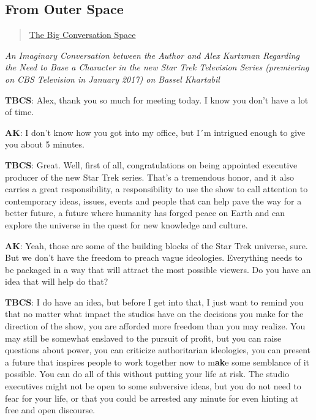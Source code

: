 \subsection{From Outer Space}\label{from-outer-space}

\begin{quote}
\href{../appendix/attributions.html\#the-big-conversation-space}{The Big
Conversation Space}
\end{quote}

\emph{An Imaginary Conversation between the Author and Alex Kurtzman
Regarding the Need to Base a Character in the new Star Trek Television
Series (premiering on CBS Television in January 2017) on Bassel
Khartabil}

\textbf{TBCS}: Alex, thank you so much for meeting today. I know you
don't have a lot of time.

\textbf{AK}: I don't know how you got into my office, but I´m intrigued
enough to give you about 5 minutes.

\textbf{TBCS}: Great. Well, first of all, congratulations on being
appointed executive producer of the new Star Trek series. That's a
tremendous honor, and it also carries a great responsibility, a
responsibility to use the show to call attention to contemporary ideas,
issues, events and people that can help pave the way for a better
future, a future where humanity has forged peace on Earth and can
explore the universe in the quest for new knowledge and culture.

\textbf{AK}: Yeah, those are some of the building blocks of the Star
Trek universe, sure. But we don't have the freedom to preach vague
ideologies. Everything needs to be packaged in a way that will attract
the most possible viewers. Do you have an idea that will help do that?

\textbf{TBCS}: I do have an idea, but before I get into that, I just
want to remind you that no matter what impact the studios have on the
decisions you make for the direction of the show, you are afforded more
freedom than you may realize. You may still be somewhat enslaved to the
pursuit of profit, but you can raise questions about power, you can
criticize authoritarian ideologies, you can present a future that
inspires people to work together now to m\textbf{ak}e some semblance of
it possible. You can do all of this without putting your life at risk.
The studio executives might not be open to some subversive ideas, but
you do not need to fear for your life, or that you could be arrested any
minute for even hinting at free and open discourse.

